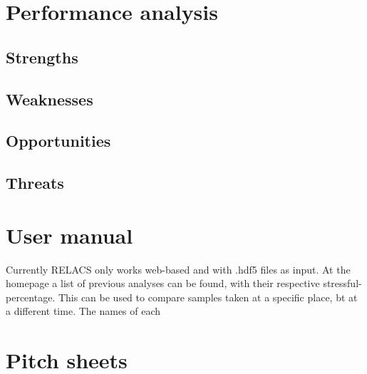 \documentclass[a4paper]{article}
\begin{document}
\section{Performance analysis}

\subsection{Strengths}
\subsection{Weaknesses}
\subsection{Opportunities}
\subsection{Threats}


\section{User manual}
Currently RELACS only works web-based and with .hdf5 files as input. At the homepage a list of previous analyses can be found, with their respective stressful-percentage. This can be used to compare samples taken at a specific place, bt at a different time. The names of each 



\section{Pitch sheets}
\end{document}
